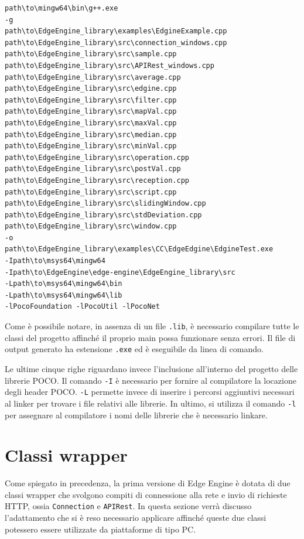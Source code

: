 \begin{verbatim}
path\to\mingw64\bin\g++.exe 
-g 
path\to\EdgeEngine_library\examples\EdgineExample.cpp
path\to\EdgeEngine_library\src\connection_windows.cpp
path\to\EdgeEngine_library\src\sample.cpp
path\to\EdgeEngine_library\src\APIRest_windows.cpp
path\to\EdgeEngine_library\src\average.cpp
path\to\EdgeEngine_library\src\edgine.cpp
path\to\EdgeEngine_library\src\filter.cpp
path\to\EdgeEngine_library\src\mapVal.cpp
path\to\EdgeEngine_library\src\maxVal.cpp
path\to\EdgeEngine_library\src\median.cpp
path\to\EdgeEngine_library\src\minVal.cpp
path\to\EdgeEngine_library\src\operation.cpp
path\to\EdgeEngine_library\src\postVal.cpp
path\to\EdgeEngine_library\src\reception.cpp
path\to\EdgeEngine_library\src\script.cpp
path\to\EdgeEngine_library\src\slidingWindow.cpp
path\to\EdgeEngine_library\src\stdDeviation.cpp
path\to\EdgeEngine_library\src\window.cpp
-o
path\to\EdgeEngine_library\examples\CC\EdgeEdgine\EdgineTest.exe
-Ipath\to\msys64\mingw64
-Ipath\to\EdgeEngine\edge-engine\EdgeEngine_library\src
-Lpath\to\msys64\mingw64\bin
-Lpath\to\msys64\mingw64\lib
-lPocoFoundation -lPocoUtil -lPocoNet
\end{verbatim}

Come è possibile notare, in assenza di un file \texttt{.lib}, è necessario compilare tutte le classi del progetto affinché il proprio main possa funzionare senza errori. Il file di output generato ha estensione \texttt{.exe} ed è eseguibile da linea di comando.

Le ultime cinque righe riguardano invece l'inclusione all'interno del progetto delle librerie POCO. Il comando \texttt{-I} è necessario per fornire al compilatore la locazione degli header POCO. \texttt{-L}  permette invece di inserire i percorsi aggiuntivi necessari al linker per trovare i file relativi alle librerie. In ultimo, si utilizza il comando \texttt{-l} per assegnare al compilatore i nomi delle librerie che è necessario linkare.  
\section{Classi wrapper}
Come spiegato in precedenza, la prima versione di Edge Engine è dotata di due classi wrapper che svolgono compiti di connessione alla rete e invio di richieste HTTP, ossia \texttt{Connection} e \texttt{APIRest}. In questa sezione verrà discusso l’adattamento che si è reso necessario applicare affinché queste due classi potessero essere utilizzate da piattaforme di tipo PC.

